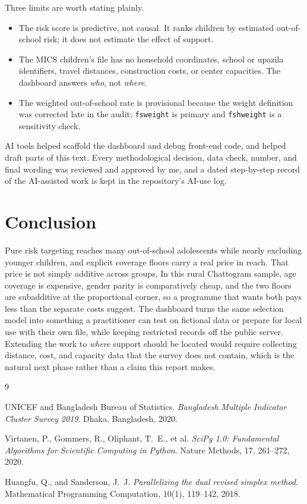 \documentclass[12.1pt,a4paper]{article}
\begin{document}
Three limits are worth stating plainly.

\begin{itemize}[leftmargin=*, itemsep=3pt]
  \item The risk score is predictive, not causal. It ranks children by estimated out-of-school risk; it does not estimate the effect of support.
  \item The MICS children's file has no household coordinates, school or upazila identifiers, travel distances, construction costs, or center capacities. The dashboard answers \emph{who}, not \emph{where}.
  \item The weighted out-of-school rate is provisional because the weight definition was corrected late in the audit; \texttt{fsweight} is primary and \texttt{fshweight} is a sensitivity check.
\end{itemize}

AI tools helped scaffold the dashboard and debug front-end code, and helped draft parts of this text. Every methodological decision, data check, number, and final wording was reviewed and approved by me, and a dated step-by-step record of the AI-assisted work is kept in the repository's AI-use log.

\section{Conclusion}

Pure risk targeting reaches many out-of-school adolescents while nearly excluding younger children, and explicit coverage floors carry a real price in reach. That price is not simply additive across groups. In this rural Chattogram sample, age coverage is expensive, gender parity is comparatively cheap, and the two floors are subadditive at the proportional corner, so a programme that wants both pays less than the separate costs suggest. The dashboard turns the same selection model into something a practitioner can test on fictional data or prepare for local use with their own file, while keeping restricted records off the public server. Extending the work to \emph{where} support should be located would require collecting distance, cost, and capacity data that the survey does not contain, which is the natural next phase rather than a claim this report makes.

\begin{thebibliography}{9}
\setlength{\itemsep}{4pt}

UNICEF and Bangladesh Bureau of Statistics.
\textit{Bangladesh Multiple Indicator Cluster Survey 2019}.
Dhaka, Bangladesh, 2020.

Virtanen, P., Gommers, R., Oliphant, T.\ E., et al.
\textit{SciPy 1.0: Fundamental Algorithms for Scientific Computing in Python}.
Nature Methods, 17, 261--272, 2020.

Huangfu, Q., and Sanderson, J.\ J.
\textit{Parallelizing the dual revised simplex method}.
Mathematical Programming Computation, 10(1), 119--142, 2018.

\end{thebibliography}
\end{document}
